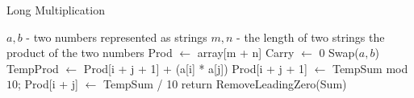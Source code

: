 \documentclass[10pt]{article}
\begin{document}
\begin{fullwidth}[width=\linewidth+4cm,leftmargin=-2cm,rightmargin=-2cm]
\begin{algorithm}[H]
  \caption{Long Multiplication}
  \begin{algorithmic}[1]
    \Require $a,b$ - two numbers represented as strings
    \Require $m,n$ - the length of two strings
    \Ensure the product of the two numbers
      \State Prod $\gets$ array[m + n]  
      \State Carry $\gets$ 0 
       Swap($a,b$)  
      \EndIf
        
            
          \State TempProd $\gets$ Prod[i + j + 1] + (a[i] * a[j])  
          \State Prod[i + j + 1] $\gets$ TempSum mod $10$;
          \State Prod[i + j]  $\gets$  TempSum / 10  
        \EndFor
      \EndFor
      \State return RemoveLeadingZero(Sum) 
    \EndProcedure
  \end{algorithmic}
\end{algorithm}



\end{fullwidth}
\end{document}
